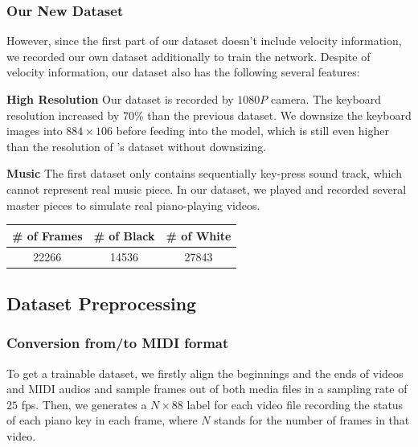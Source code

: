 \documentclass[10pt,twocolumn,letterpaper]{article}
\begin{document}
   \subsubsection{Our New Dataset}

   However, since the first part of our dataset doesn't include velocity information, we recorded our own dataset additionally to train the network.
   Despite of velocity information, our dataset also has the following several features:

   \textbf{High Resolution} Our dataset is recorded by $1080P$ camera. The keyboard resolution increased by $70\%$ than the previous dataset. We downsize the keyboard images into \(884 \times 106\) before feeding into the model, which is still even higher than the resolution of \cite{Akbari}'s dataset without downsizing.

   \textbf{Music} The first dataset only contains sequentially key-press sound track, which cannot represent real music piece. 
   In our dataset, we played and recorded several master pieces to simulate real piano-playing videos.\\

   \begin{minipage}{0.9\linewidth}
      \centering
   \begin{tabular}{ccc}
      \toprule
      \# of Frames&\# of Black&\# of White\\
      \midrule
      22266&14536&27843\\
      \bottomrule
      \end{tabular}
       \label{tab:ourdataset} 
   \end{minipage}

\subsection{Dataset Preprocessing}

\subsubsection{Conversion from/to MIDI format}

To get a trainable dataset, we firstly align the beginnings and the ends of videos and MIDI audios and sample frames out of both media files in a sampling rate of $25$ fps. 
Then, we generates a \(N \times 88\) label for each video file recording the status of each piano key in each frame, where \(N\) stands for the number of frames in that video.
\end{document}
